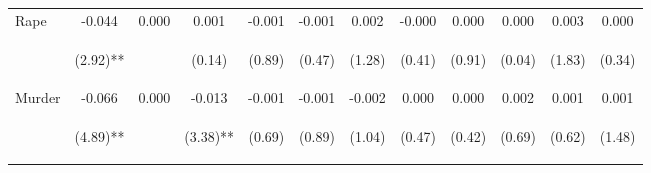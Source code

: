 \begin{tabular}{lccccccccccc}
\noalign{\smallskip}Rape & -0.044 & 0.000 & 0.001 & -0.001 & -0.001 & 0.002 & -0.000 & 0.000 & 0.000 & 0.003 & 0.000\\
 & \begin{footnotesize}(2.92)**\end{footnotesize} & \begin{footnotesize}\end{footnotesize} & \begin{footnotesize}(0.14)\end{footnotesize} & \begin{footnotesize}(0.89)\end{footnotesize} & \begin{footnotesize}(0.47)\end{footnotesize} & \begin{footnotesize}(1.28)\end{footnotesize} & \begin{footnotesize}(0.41)\end{footnotesize} & \begin{footnotesize}(0.91)\end{footnotesize} & \begin{footnotesize}(0.04)\end{footnotesize} & \begin{footnotesize}(1.83)\end{footnotesize} & \begin{footnotesize}(0.34)\end{footnotesize}\\
\noalign{\smallskip}Murder & -0.066 & 0.000 & -0.013 & -0.001 & -0.001 & -0.002 & 0.000 & 0.000 & 0.002 & 0.001 & 0.001\\
 & \begin{footnotesize}(4.89)**\end{footnotesize} & \begin{footnotesize}\end{footnotesize} & \begin{footnotesize}(3.38)**\end{footnotesize} & \begin{footnotesize}(0.69)\end{footnotesize} & \begin{footnotesize}(0.89)\end{footnotesize} & \begin{footnotesize}(1.04)\end{footnotesize} & \begin{footnotesize}(0.47)\end{footnotesize} & \begin{footnotesize}(0.42)\end{footnotesize} & \begin{footnotesize}(0.69)\end{footnotesize} & \begin{footnotesize}(0.62)\end{footnotesize} & \begin{footnotesize}(1.48)\end{footnotesize}\\

\end{tabular}
